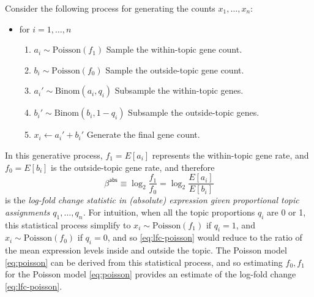 \documentclass[final]{siamart171218}
\begin{document}
Consider the following process for generating the counts $x_1, \ldots,
x_n$:
\begin{itemize}

\item for $i = 1, \ldots, n$
\begin{enumerate}

\item $a_i \sim \mathrm{Poisson}(f_1)$ 
\hfill Sample the within-topic gene count. \hspace{2em}

\item $b_i \sim \mathrm{Poisson}(f_0)$ 
\hfill Sample the outside-topic gene count. \hspace{2em}

\item $a_i' \sim \mathrm{Binom}(a_i, q_i)$ 
\hfill Subsample the within-topic genes. \hspace{2em}

\item $b_i' \sim \mathrm{Binom}(b_i, 1-q_i)$ 
\hfill Subsample the outside-topic genes. \hspace{2em}

\item $x_i \leftarrow a_i' + b_i'$ 
\hfill Generate the final gene count. \hspace{2em}

\end{enumerate}
\end{itemize}
In this generative process, $f_1 = E[a_i]$ represents the
within-topic gene rate, and $f_0 = E[b_i]$ is the outside-topic gene
rate, and therefore 
\begin{equation}
\beta^{\mathsf{abs}} \equiv 
\log_2 \frac{f_1}{f_0} = \log_2 \frac{E[a_i]}{E[b_i]}
\label{eq:lfc-poisson}
\end{equation}
is the {\em log-fold change statistic in (absolute) expression given
  proportional topic assignments $q_1, \ldots, q_n$.} For intuition,
when all the topic proportions $q_i$ are 0 or 1, this statistical
process simplify to $x_i \sim \mathrm{Poisson}(f_1)$ if $q_i = 1$, and
$x_i \sim \mathrm{Poisson}(f_0)$ if $q_i = 0$, and so
\eqref{eq:lfc-poisson} would reduce to the ratio of the mean
expression levels inside and outside the topic. The Poisson model
\eqref{eq:poisson} can be derived from this statistical process, and
so estimating $f_0, f_1$ for the Poisson model \eqref{eq:poisson}
provides an estimate of the log-fold change \eqref{eq:lfc-poisson}.



\end{document}
